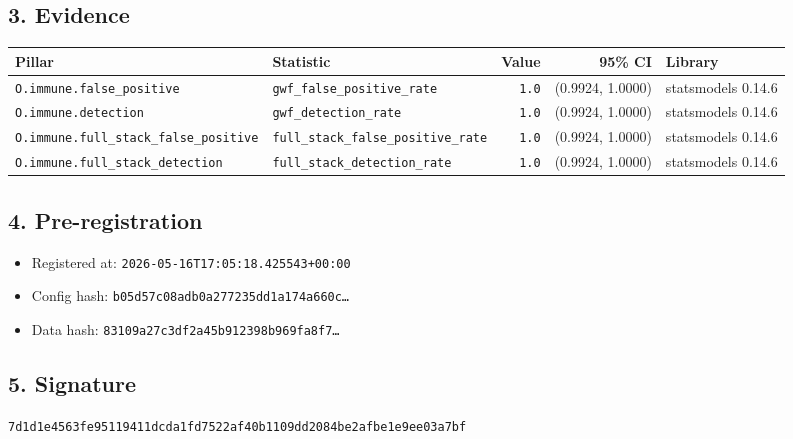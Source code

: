 \documentclass{article}
\begin{document}
\subsection*{3. Evidence}
\begin{tabular}{llrrl}\toprule
\textbf{Pillar} & \textbf{Statistic} & \textbf{Value} & \textbf{95\% CI} & \textbf{Library} \\\midrule
\texttt{O.immune.false\_positive} & \texttt{gwf\_false\_positive\_rate} & \texttt{1.0} & (0.9924, 1.0000) & statsmodels 0.14.6 \\
\texttt{O.immune.detection} & \texttt{gwf\_detection\_rate} & \texttt{1.0} & (0.9924, 1.0000) & statsmodels 0.14.6 \\
\texttt{O.immune.full\_stack\_false\_positive} & \texttt{full\_stack\_false\_positive\_rate} & \texttt{1.0} & (0.9924, 1.0000) & statsmodels 0.14.6 \\
\texttt{O.immune.full\_stack\_detection} & \texttt{full\_stack\_detection\_rate} & \texttt{1.0} & (0.9924, 1.0000) & statsmodels 0.14.6 \\
\bottomrule\end{tabular}
\subsection*{4. Pre-registration}
\begin{itemize}
\item Registered at: \texttt{2026-05-16T17:05:18.425543+00:00}
\item Config hash: \texttt{b05d57c08adb0a277235dd1a174a660c\dots}
\item Data hash: \texttt{83109a27c3df2a45b912398b969fa8f7\dots}
\end{itemize}
\subsection*{5. Signature}
\texttt{7d1d1e4563fe95119411dcda1fd7522af40b1109dd2084be2afbe1e9ee03a7bf}\\
\end{document}
